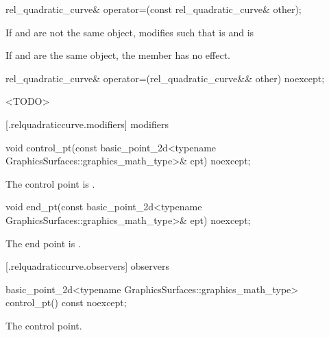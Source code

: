 %
\begin{itemdecl}
rel_quadratic_curve& operator=(const rel_quadratic_curve& other);
\end{itemdecl}
\begin{itemdescr}
\pnum
\effects
If  and  are not the same object, modifies  such that  is  and  is 

\pnum
If  and  are the same object, the member has no effect.

\pnum
\returns
{}
\end{itemdescr}

%
\begin{itemdecl}
rel_quadratic_curve& operator=(rel_quadratic_curve&& other) noexcept;
\end{itemdecl}
\begin{itemdescr}
\pnum
\effects
<TODO>

\pnum
\returns
{}
\end{itemdescr}

 [\iotwod.relquadraticcurve.modifiers]{ modifiers}

%
\begin{itemdecl}
void control_pt(const basic_point_2d<typename GraphicsSurfaces::graphics_math_type>& cpt) noexcept;
\end{itemdecl}
\begin{itemdescr}
\pnum
\effects
The control point is .
\end{itemdescr}

%
\begin{itemdecl}
void end_pt(const basic_point_2d<typename GraphicsSurfaces::graphics_math_type>& ept) noexcept;
\end{itemdecl}
\begin{itemdescr}
\pnum
\effects
The end point is .
\end{itemdescr}

 [\iotwod.relquadraticcurve.observers]{ observers}

%
\begin{itemdecl}
basic_point_2d<typename GraphicsSurfaces::graphics_math_type> control_pt() const noexcept;
\end{itemdecl}
\begin{itemdescr}
\pnum
\returns
The control point.
\end{itemdescr}

